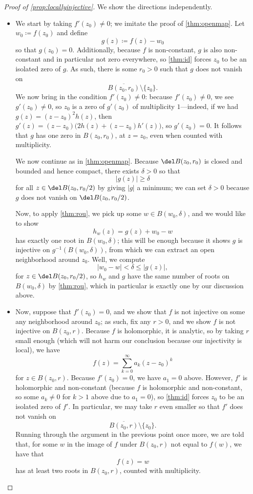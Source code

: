 \begin{proof}[Proof of \autoref{prop:locallyinjective}]
	We show the directions independently.
	\begin{itemize}
		\item We start by taking $f'(z_0)\ne0$; we imitate the proof of \autoref{thm:openmap}. Let $w_0\coloneqq f(z_0)$ and define
		\[g(z)\coloneqq f(z)-w_0\]
		so that $g(z_0)=0$. Additionally, because $f$ is non-constant, $g$ is also non-constant and in particular not zero everywhere, so \autoref{thm:id} forces $z_0$ to be an isolated zero of $g$. As such, there is some $r_0>0$ such that $g$ does not vanish on
		\[\overline{B(z_0,r_0)}\setminus\{z_0\}.\]
		We now bring in the condition $f'(z_0)\ne0$: because $f'(z_0)\ne0$, we see $g'(z_0)\ne0$, so $z_0$ is a zero of $g'(z_0)$ of multiplicity $1$---indeed, if we had $g(z)=(z-z_0)^2h(z)$, then $g'(z)=(z-z_0)\big(2h(z)+(z-z_0)h'(z)\big)$, so $g'(z_0)=0$. It follows that $g$ has one zero in $B(z_0,r_0)$, at $z=z_0$, even when counted with multiplicity.
	
		We now continue as in \autoref{thm:openmap}. Because $\del B(z_0,r_0)$ is closed and bounded and hence compact, there exists $\delta>0$ so that
		\[|g(z)|\ge\delta\]
		for all $z\in\del B(z_0,r_0/2)$ by giving $|g|$ a minimum; we can set $\delta>0$ because $g$ does not vanish on $\del B(z_0,r_0/2)$.
	
		Now, to apply \autoref{thm:rou}, we pick up some $w\in B(w_0,\delta)$, and we would like to show 
		\[h_w(z)=g(z)+w_0-w\]
		has exactly one root in $B(w_0,\delta)$; this will be enough because it shows $g$ is injective on $g^{-1}(B(w_0,\delta))$, from which we can extract an open neighborhood around $z_0$. Well, we compute
		\[|w_0-w|<\delta\le|g(z)|,\]
		for $z\in\del B(z_0,r_0/2)$, so $h_w$ and $g$ have the same number of roots on $B(w_0,\delta)$ by \autoref{thm:rou}, which in particular is exactly one by our discussion above.
	
		\item Now, suppose that $f'(z_0)=0$, and we show that $f$ is not injective on some any neighborhood around $z_0$; as such, fix any $r>0$, and we show $f$ is not injective on $B(z_0,r)$. Because $f$ is holomorphic, it is analytic, so by taking $r$ small enough (which will not harm our conclusion because our injectivity is local), we have
		\[f(z)=\sum_{k=0}^\infty a_k(z-z_0)^k\]
		for $z\in B(z_0,r)$. Because $f'(z_0)=0$, we have $a_1=0$ above. However, $f'$ is holomorphic and non-constant (because $f$ is holomorphic and non-constant, so some $a_k\ne0$ for $k>1$ above due to $a_1=0$), so \autoref{thm:id} forces $z_0$ to be an isolated zero of $f'$. In particular, we may take $r$ even smaller so that $f'$ does not vanish on
		\[\overline{B(z_0,r)}\setminus\{z_0\}.\]
		Running through the argument in the previous point once more, we are told that, for some $w$ in the image of $f$ under $B(z_0,r)$ not equal to $f(w)$, we have that
		\[f(z)=w\]
		has at least two roots in $B(z_0,r)$, counted with multiplicity.


\end{itemize}
\end{proof}
